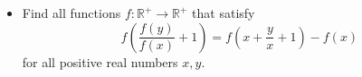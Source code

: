 \documentclass[11pt]{scrartcl}
\begin{document}
\begin{itemize}[label=,itemsep=0.4em,leftmargin=0em]
\begin{comment}
        \vocab{Subcase 2.1:} \( f(a) = f(3a) \).

        Using \( (2) \) with \( P(a,3a) \), we get \( f(a) = 0, \forall a \in \bb{Z} \).

        \vocab{Subcase 2.2:} \( f(3a) = 9f(a) \).

        We will prove \( f(na) = n^2f(a) \) by induction. For \( n = 2,3 \), it is true. Assume \( f(ka) = k^2f(a) \) for all \( k \leq n \).

        From \( (2) \) using \( P(na,a) \), we get
        \[
            (n^2 - 1)^2f(a)^2 - (2n^2 + 2)f(a)f((n + 1)a) + f((n + 1)a)^2 = 0
        \]
        Which simplifies to
        \[
            [(n + 1)f(a)^2 - f((n + 1)a)][(n - 1)^2f(a) - f((n + 1)a)] = 0
        \]

        If \( (n - 1)^2f(a) = f((n + 1)a) \), then similar to Subcase 2.1, we get \( f(a) = 0, \forall a \in \bb{Z} \).

        For \( (n + 1)f(a)^2 = f((n + 1)a) \), induction is completed. Taking \( a = 1 = d \), we get \( f(n) = dn^2, \forall n \in \bb{N} \). Since \( f \) is even, \( f(-n) = dn^2 \).

        Thus, the functions satisfying the conditions are \( \boxed{f(a) = da^2, \forall a \in \bb{Z}} \) where \( d \in \bb{Z} \), and 
        \[
        \boxed{ f(a)=
        \left\{\begin{array}{rr}0,&a \text{ even }\\
            c,&a \text{ odd }
        \end{array}
        \right.
        }
        \]
    \end{comment}
    
    
    \item \begin{btvn}
        Find all functions $f: \mathbb{R^+} \to \mathbb{R^+}$ that satisfy
        \[f\left(\frac{f(y)}{f(x)}+1\right)=f\left(x+\frac{y}{x}+1\right)-f(x)\]
        for all positive real numbers $x,y$.
    \end{btvn}
    \begin{comment}
        Denote $P(x,y)$ as the substitution into $(1)$.

        Substituting $P(x,x)$ we get \[f(2) = f(x + 2) - f(x), \xr \tag{2}\]

        We will prove that $f$ is injective. Assume there exist $a,b$ such that $f(a) = f(b)$ and $a > b$. From $P(x,a)$ and $P(x,b)$ we get 
        \[
            f\left(x + \frac{a}{x} + 1\right) = f\left(x + \frac{b}{x} + 1\right), \xro
        \]
        Setting $x = \frac{a - b}{2}$, we get 
        \[
            f\left(\frac{a - b}{2} + \frac{2a}{a - b} + 1\right) = f\left(\frac{a - b}{2} + \frac{2b}{a - b} + 1\right)
        \]


\end{comment}
\end{itemize}
\end{document}
